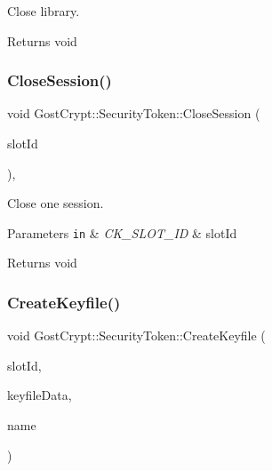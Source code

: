 Close library. 

\begin{DoxyReturn}{Returns}
void 
\end{DoxyReturn}
\mbox{\label{class_gost_crypt_1_1_security_token_a1fbc1972f699b9629d408ed5db81e6ee}} 
\subsubsection{\texorpdfstring{Close\+Session()}{CloseSession()}}
{\footnotesize\ttfamily void Gost\+Crypt\+::\+Security\+Token\+::\+Close\+Session (\begin{DoxyParamCaption}\item[{C\+K\+\_\+\+S\+L\+O\+T\+\_\+\+ID}]{slot\+Id }\end{DoxyParamCaption})\hspace{0.3cm}{\ttfamily [static]}, {\ttfamily [protected]}}



Close one session. 


\begin{DoxyParams}[1]{Parameters}
\mbox{\tt in}  & {\em C\+K\+\_\+\+S\+L\+O\+T\+\_\+\+ID} & slot\+Id \\
\hline
\end{DoxyParams}
\begin{DoxyReturn}{Returns}
void 
\end{DoxyReturn}
\mbox{\label{class_gost_crypt_1_1_security_token_a72731ca68789319a814ecb16194bfb2c}} 
\subsubsection{\texorpdfstring{Create\+Keyfile()}{CreateKeyfile()}}
{\footnotesize\ttfamily void Gost\+Crypt\+::\+Security\+Token\+::\+Create\+Keyfile (\begin{DoxyParamCaption}\item[{C\+K\+\_\+\+S\+L\+O\+T\+\_\+\+ID}]{slot\+Id,  }\item[{vector$<$ byte $>$ \&}]{keyfile\+Data,  }\item[{const string \&}]{name }\end{DoxyParamCaption})\hspace{0.3cm}{\ttfamily [static]}}


